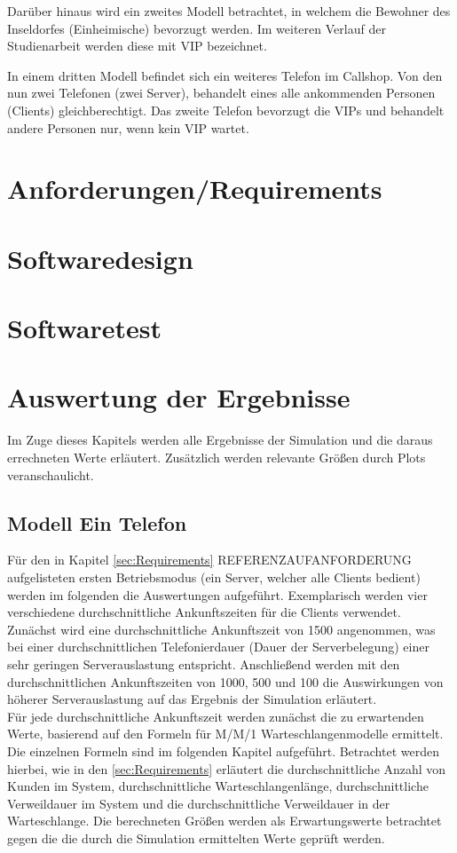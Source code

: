 Darüber hinaus wird ein zweites Modell betrachtet, in welchem die Bewohner des Inseldorfes (Einheimische) bevorzugt werden. Im weiteren Verlauf der Studienarbeit werden diese mit VIP bezeichnet. 

In einem dritten Modell befindet sich ein weiteres Telefon im Callshop. Von den nun zwei Telefonen (zwei Server), behandelt eines alle ankommenden Personen (Clients) gleichberechtigt. Das zweite Telefon bevorzugt die VIPs und behandelt andere Personen nur, wenn kein VIP wartet.

\section{Anforderungen/Requirements}

\section{Softwaredesign}

\section{Softwaretest}

\section{Auswertung der Ergebnisse}
Im Zuge dieses Kapitels werden alle Ergebnisse der Simulation und die daraus errechneten Werte erläutert. Zusätzlich werden relevante Größen durch Plots veranschaulicht.

\subsection{Modell \glqq Ein Telefon\grqq} 
Für den in Kapitel \ref{sec:Requirements} REFERENZAUFANFORDERUNG aufgelisteten ersten Betriebsmodus (ein Server, welcher alle Clients bedient) werden im folgenden die Auswertungen aufgeführt. Exemplarisch werden vier verschiedene durchschnittliche Ankunftszeiten für die Clients verwendet. Zunächst wird eine durchschnittliche Ankunftszeit von 1500 angenommen, was bei einer durchschnittlichen Telefonierdauer (Dauer der Serverbelegung) einer sehr geringen Serverauslastung entspricht. Anschließend werden mit den durchschnittlichen Ankunftszeiten von 1000, 500 und 100 die Auswirkungen von höherer Serverauslastung auf das Ergebnis der Simulation erläutert. \\

Für jede durchschnittliche Ankunftszeit werden zunächst die zu erwartenden Werte, basierend auf den Formeln für M/M/1 Warteschlangenmodelle ermittelt. Die einzelnen Formeln sind im folgenden Kapitel aufgeführt. Betrachtet werden hierbei, wie in den \ref{sec:Requirements} erläutert die durchschnittliche Anzahl von Kunden im System, durchschnittliche Warteschlangenlänge, durchschnittliche Verweildauer im System und die durchschnittliche Verweildauer in der Warteschlange. Die berechneten Größen werden als Erwartungswerte betrachtet gegen die die durch die Simulation ermittelten Werte geprüft werden. 

